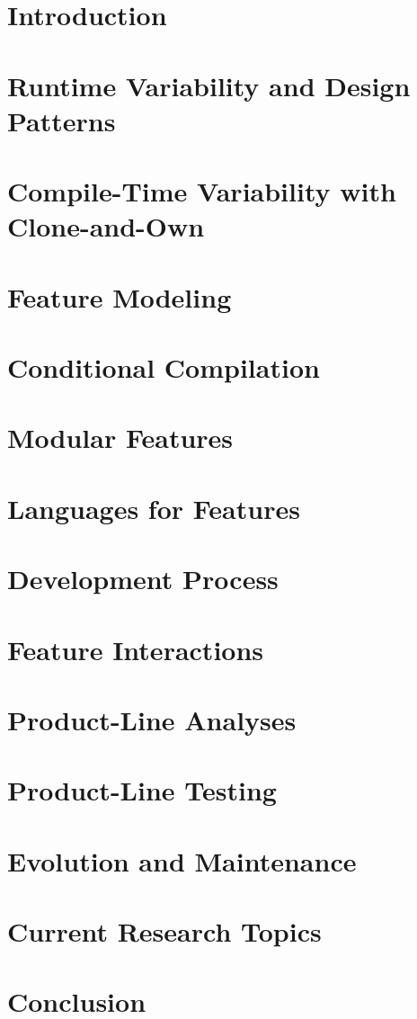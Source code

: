\documentclass[
	aspectratio=169, %
	8pt, %
	handout, %
]{beamer}
\subtitle{Lecture Topics}
\author{Thomas Thüm, Timo Kehrer, Elias Kuiter}
\newcommand{\addlecture}[2]{\section{#2}\begin{frame}\end{frame}}
\begin{document}
	
\contentoverview
\usebackgroundtemplate{}
\AtBeginSection[]{}

\addlecture{01-introduction}{Introduction}
\addlecture{02-runtime}{Runtime Variability and Design Patterns}
\addlecture{03-cloneandown}{Compile-Time Variability with Clone-and-Own}
\sectionend

\addlecture{04-modeling}{Feature Modeling}
\addlecture{05-conditional}{Conditional Compilation}
\addlecture{06-modular}{Modular Features}
\addlecture{07-languages}{Languages for Features}
\addlecture{08-process}{Development Process}
\sectionend

\addlecture{09-interactions}{Feature Interactions}
\addlecture{10-analyses}{Product-Line Analyses}
\addlecture{11-testing}{Product-Line Testing}
\addlecture{12-evonance}{Evolution and Maintenance}
\sectionend

\addlecture{13-advanced}{Current Research Topics} %
\addlecture{14-conclusion}{Conclusion}
\end{document}

